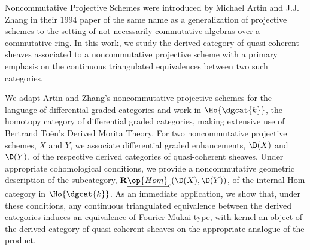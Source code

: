 Noncommutative Projective Schemes were introduced by Michael Artin and J.J. Zhang in their 1994 paper of the same name as a generalization of projective schemes to the setting of not necessarily commutative algebras over a commutative ring.
In this work, we study the derived category of quasi-coherent sheaves associated to a noncommutative projective scheme with a primary emphasis on the continuous triangulated equivalences between two such categories.

We adapt Artin and Zhang's noncommutative projective schemes for the language of differential graded categories and work in \(\Ho{\dgcat{k}}\), the homotopy category of differential graded categories, making extensive use of Bertrand To\"en's Derived Morita Theory.
For two noncommutative projective schemes, \(X\) and \(Y\), we associate differential graded enhancements, \(\D(X)\) and \(\D(Y)\), of the respective derived categories of quasi-coherent sheaves.
Under appropriate cohomological conditions, we provide a noncommutative geometric description of the subcategory, \(\mathbf{R}\underline{\op{Hom}}_c(\D(X), \D(Y))\), of the internal Hom category in \(\Ho{\dgcat{k}}\).
As an immediate application, we show that, under these conditions, any continuous triangulated equivalence between the derived categories induces an equivalence of Fourier-Mukai type, with kernel an object of the derived category of quasi-coherent sheaves on the appropriate analogue of the product.
